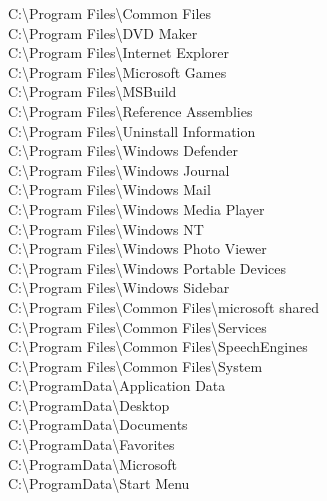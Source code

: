 \noindent C:\textbackslash Program Files\textbackslash Common Files \\
C:\textbackslash Program Files\textbackslash DVD Maker \\
C:\textbackslash Program Files\textbackslash Internet Explorer \\
C:\textbackslash Program Files\textbackslash Microsoft Games \\
C:\textbackslash Program Files\textbackslash MSBuild \\
C:\textbackslash Program Files\textbackslash Reference Assemblies \\
C:\textbackslash Program Files\textbackslash Uninstall Information \\
C:\textbackslash Program Files\textbackslash Windows Defender \\
C:\textbackslash Program Files\textbackslash Windows Journal \\
C:\textbackslash Program Files\textbackslash Windows Mail \\
C:\textbackslash Program Files\textbackslash Windows Media Player \\
C:\textbackslash Program Files\textbackslash Windows NT \\
C:\textbackslash Program Files\textbackslash Windows Photo Viewer \\
C:\textbackslash Program Files\textbackslash Windows Portable Devices \\
C:\textbackslash Program Files\textbackslash Windows Sidebar \\
C:\textbackslash Program Files\textbackslash Common Files\textbackslash microsoft shared \\
C:\textbackslash Program Files\textbackslash Common Files\textbackslash Services \\
C:\textbackslash Program Files\textbackslash Common Files\textbackslash SpeechEngines \\
C:\textbackslash Program Files\textbackslash Common Files\textbackslash System \\
C:\textbackslash ProgramData\textbackslash Application Data \\
C:\textbackslash ProgramData\textbackslash Desktop \\
C:\textbackslash ProgramData\textbackslash Documents \\
C:\textbackslash ProgramData\textbackslash Favorites \\
C:\textbackslash ProgramData\textbackslash Microsoft \\
C:\textbackslash ProgramData\textbackslash Start Menu \\
